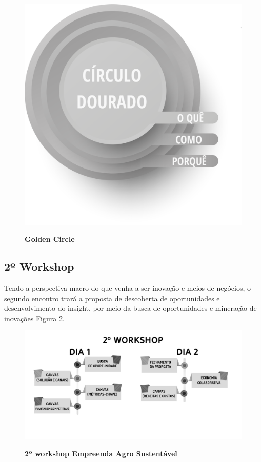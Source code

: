 \begin{figure}[!h]
\centering
\caption{\textbf{Golden Circle}}
\includegraphics[scale=0.3]{Imagens/circulo_dourado.png}
\label{figura_5}
\end{figure}
\newpage

\subsection{2º Workshop}

Tendo a perspectiva macro do que venha a ser inovação e meios de negócios, o segundo encontro trará a proposta de descoberta de oportunidades e desenvolvimento do insight, por meio da busca de oportunidades e mineração de inovações Figura \ref{figura_31}.


\begin{figure}[!h]
\centering
\caption{\textbf{2º workshop Empreenda Agro Sustentável}}
\includegraphics[scale=0.3]{Imagens/workshop-02.png}
\label{figura_31}
\end{figure}

